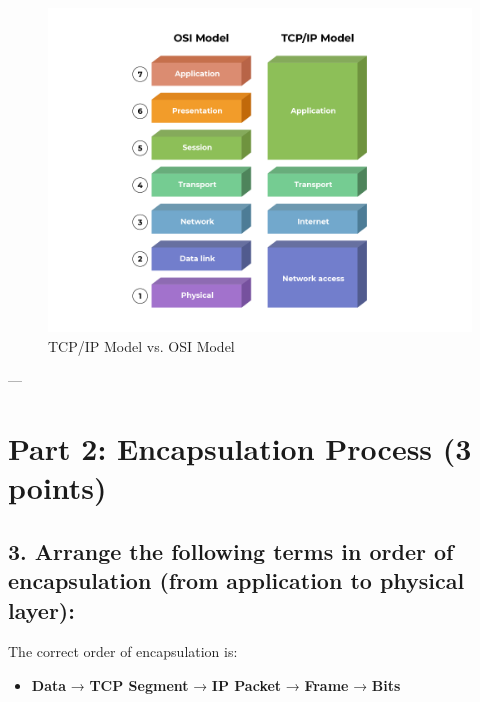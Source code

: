 \documentclass{article}
\begin{document}
\begin{figure}[H]
	\centering
	\includegraphics[width=1\textwidth]{tcpModel.png}
	\caption{TCP/IP Model vs. OSI Model}
	\label{fig:1}
\end{figure}

---

\section*{Part 2: Encapsulation Process (3 points)}

\subsection*{3. Arrange the following terms in order of encapsulation (from application to physical layer):}

The correct order of encapsulation is:
\begin{itemize}
    \item \textbf{Data} → \textbf{TCP Segment} → \textbf{IP Packet} → \textbf{Frame} → \textbf{Bits}
\end{itemize}
\end{document}
